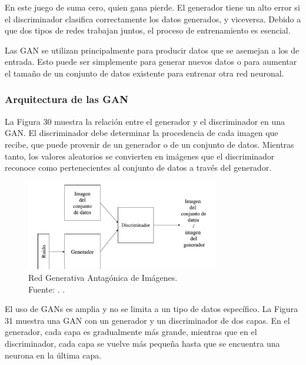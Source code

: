 En este juego de suma cero, quien gana pierde. El generador tiene un alto error si el discriminador clasifica correctamente los datos generados, y viceversa. Debido a que dos tipos de redes trabajan juntos, el proceso de entrenamiento es esencial. \parencite{tec_goodfellow2014gan}

Las GAN se utilizan principalmente para producir datos que se asemejan a los de entrada. Esto puede ser simplemente para generar nuevos datos o para aumentar el tamaño de un conjunto de datos existente para entrenar otra red neuronal. \parencite{tec_goodfellow2014gan}

\subsubsection{Arquitectura de las GAN}

La Figura 30 muestra la relación entre el generador y el discriminador en una GAN. El discriminador debe determinar la procedencia de cada imagen que recibe, que puede provenir de un generador o de un conjunto de datos. Mientras tanto, los valores aleatorios se convierten en imágenes que el discriminador reconoce como pertenecientes al conjunto de datos a través del generador. \parencite{tec_goodfellow2014gan}

\begin{figure}[!ht]
	\begin{center}
		\includegraphics[width=0.75\textwidth]{2/figures/redgan.jpg}
		\caption[Red Generativa Antagónica de Imágenes]{Red Generativa Antagónica de Imágenes.\\
		Fuente: \cite{tec_goodfellow2014gan}. .}
		\label{2:fig47}
	\end{center}
\end{figure}

El uso de GANs es amplia y no se limita a un tipo de datos específico. La Figura 31 muestra una GAN con un generador y un discriminador de dos capas. En el generador, cada capa es gradualmente más grande, mientras que en el discriminador, cada capa se vuelve más pequeña hasta que se encuentra una neurona en la última capa. \parencite{tec_goodfellow2014gan}

